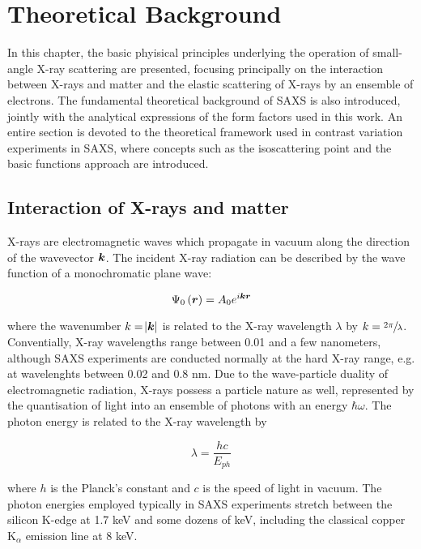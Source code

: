 \chapter{Theoretical Background}
\label{chap:theory_SAXS}
In this chapter, the basic phyisical principles underlying the operation of small-angle X-ray scattering are presented, focusing principally on the interaction between X-rays and matter and the elastic scattering of X-rays by an ensemble of electrons. The fundamental theoretical background of SAXS is also introduced, jointly with the analytical expressions of the form factors used in this work. An entire section is devoted to the theoretical framework used in contrast variation experiments in SAXS, where concepts such as the isoscattering point and the basic functions approach are introduced.

\section{Interaction of X-rays and matter}

X-rays are electromagnetic waves which propagate in vacuum along the direction of the wavevector $\bm{k}$. The incident X-ray radiation can be described by the wave function of a monochromatic plane wave:

\begin{equation}
        \label{eq:IncidentWave}
        \Psi_0\left( \bm{r} \right)=A_0 e^{i \bm{k}\bm{r} }
\end{equation}

where the wavenumber $k=\abs{\bm{k}}$ is related to the X-ray wavelength $\lambda$ by $k=\sfrac{2\pi}{\lambda}$. Conventially, X-ray wavelengths range between 0.01 and a few nanometers, although SAXS experiments are conducted normally at the hard X-ray range, e.g. at wavelenghts between 0.02 and 0.8 nm. Due to the wave-particle duality of electromagnetic radiation, X-rays possess a particle nature as well, represented by the quantisation of light into an ensemble of photons with an energy $\hbar \omega$. The photon energy is related to the X-ray wavelength by \citep{als-nielsen_elements_2011}

\begin{equation}
        \lambda = \frac{h c}{E_{ph}}
\end{equation}

where $h$ is the Planck's constant and $c$ is the speed of light in vacuum. The photon energies employed typically in SAXS experiments stretch between the silicon K-edge at 1.7 keV and some dozens of keV, including the classical copper K$_{\alpha}$ emission line at 8 keV.

